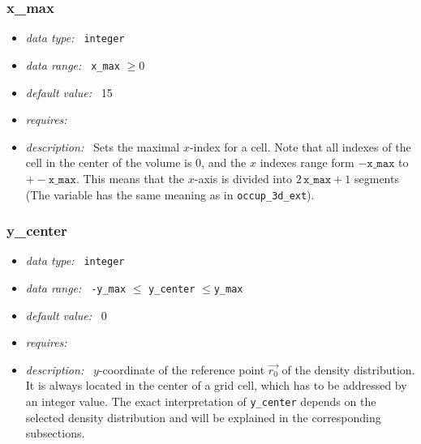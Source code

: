 \documentclass[a4paper,10pt]{article}
\begin{document}
\subsubsection{x\_max}
\label{hydopt:xmax}
\begin{itemize}
 \item \textit{data type:~} \texttt{integer}
 \item \textit{data range:~} \texttt{x\_max} $\ge0$
 \item \textit{default value:~} 15
 \item \textit{requires:~} 
 \item \textit{description:~} Sets the maximal $x$-index for a cell. Note that
  all indexes of the cell in the center of the volume is 0, and the  $x$ 
  indexes range form $-\mathtt{x\_max}$ to $+-\mathtt{x\_max}$. This means that 
  the $x$-axis is divided into $2\, \mathtt{x\_max} +1$ segments (The variable 
  has the same meaning as in \texttt{occup\_3d\_ext}).
\end{itemize}

\subsubsection{y\_center}
\label{hydopt:ycenter}
\begin{itemize}
 \item \textit{data type:~} \texttt{integer}
 \item \textit{data range:~} \texttt{-y\_max} $ \leq$ \texttt{y\_center} 
  $\leq $\texttt{y\_max} 
 \item \textit{default value:~} 0
 \item \textit{requires:~} 
 \item \textit{description:~} $y$-coordinate of the reference point $\vec{r_0}$
  of the density distribution.  It is always located in the center of a grid 
  cell, which has to be addressed by an integer value. 
  The exact interpretation of \texttt{y\_center} depends on the selected 
  density distribution and will be 
  explained in the corresponding subsections.
\end{itemize}
\end{document}
